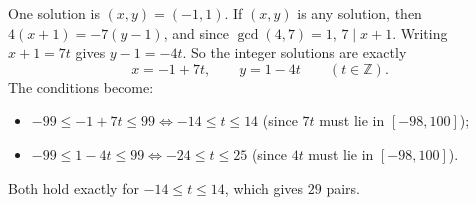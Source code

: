 One solution is $(x,y)=(-1,1)$. If $(x,y)$ is any solution, then $4(x+1)=-7(y-1)$, and since $\gcd(4,7)=1$, $7\mid x+1$. Writing $x+1=7t$ gives $y-1=-4t$. So the integer solutions are exactly
\[x=-1+7t,\qquad y=1-4t\qquad(t\in\mathbb Z).\]
The conditions become:
\begin{itemize}
\item $-99\le-1+7t\le99\iff-14\le t\le14$ (since $7t$ must lie in $[-98,100]$);
\item $-99\le1-4t\le99\iff-24\le t\le25$ (since $4t$ must lie in $[-98,100]$).
\end{itemize}
Both hold exactly for $-14\le t\le14$, which gives $\boxed{29}$ pairs.
